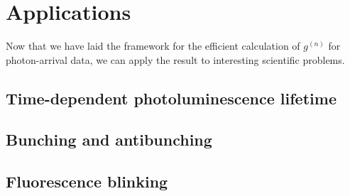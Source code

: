 \documentclass{article}
\newcommand{\gn}[1]{\ensuremath{g^{(#1)}}}
\begin{document}
\section{Applications}
Now that we have laid the framework for the efficient calculation of \gn{n} for photon-arrival data, we can apply the result to interesting scientific problems.

\subsection{Time-dependent photoluminescence lifetime}
\subsection{Bunching and antibunching}
\subsection{Fluorescence blinking}
\end{document}
